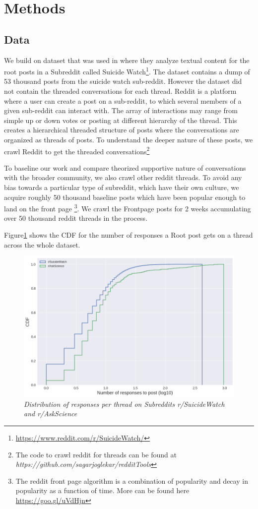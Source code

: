 \section{Methods}
\subsection{Data}
We build on dataset that was used in \cite{gkotsis2017characterisation} where they analyze textual content for the root posts in a Subreddit called Suicide Watch\footnote{\url{https://www.reddit.com/r/SuicideWatch/}}. The dataset contains a dump of 53 thousand posts from the suicide watch sub-reddit. 
However the dataset did not contain the threaded conversations for each thread. Reddit is a platform where a user can create a post on a sub-reddit, to which several members of a given sub-reddit can interact with. The array of interactions may range from simple up or down votes or posting at different hierarchy of the thread. This creates a hierarchical threaded structure of posts where the conversations are organized as threads of posts. To understand the deeper nature of these posts,  we crawl Reddit to get the threaded conversations\footnote{The code to crawl reddit for threads can be found at \textit{https://github.com/sagarjoglekar/redditTools}} 

To baseline our work and compare theorized supportive nature of conversations with the broader community, we also crawl other reddit threads. To avoid any bias towards a particular type of subreddit, which have their own culture, we acquire roughly 50 thousand baseline posts which have been popular enough to land on the front page \footnote{The reddit front page algorithm is a combination of popularity and decay in popularity as a function of time. More can be found here \url{https://goo.gl/uVdHjn}}. We crawl the Frontpage posts for 2 weeks accumulating over 50 thousand reddit threads in the process. 

Figure\ref{fig:responseDist} shows the CDF for the number of responses a Root post gets on a thread across the whole dataset. 
\begin{figure}[!htb]
	\centering
	\includegraphics[width=0.5\columnwidth]{Figures/responseDistSW}
	\caption{\textsl{ Distribution of responses per thread on Subreddits r/SuicideWatch and r/AskScience }}
	\label{fig:responseDist}
\end{figure}

